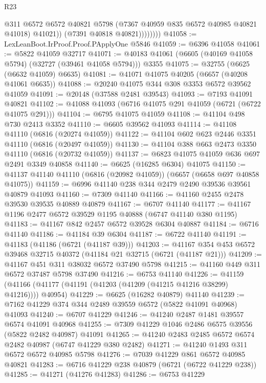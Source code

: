 \begin{lexlean}{R23}
\begin{coremodule}
                      @311
                      @6572
                      @6572
                      @40821
                      @5798
                      (@7367 @40959 @835 @6572 @40985 @40821 @41018)
                      @41021))
                  (@7391 @40818 @40821))))))))
@41058 := LexLeanBoot.IrProof.Proof.PApplyOne @5846
@41059 := @6396 @41058
@41061 := @5822 @41059 @32717
@41071 := @40183 @41061 (@6605 (@40169 @41058 @5794) (@32727 (@39461 @41058 @5794))) @3355
@41075 := @32755 (@6625 (@6632 @41059) @6635)
@41081 := @41071 @41075 @40205 (@6657 (@40208 @41061 @6635))
@41088 := @20240 @41075 @344 @308 @3353 @6572 @39562 @41059
@41091 := @20148 (@37588 @2481 @39543)
@41093 := @7193 @41091 @40821
@41102 := @41088 @41093 (@6716 @41075 @291 @41059 (@6721 (@6722 @41075 @291)))
@41104 := @6795 @41075 @41059
@41108 := @41104 @498 @730 @2413 @3352
@41110 := @6605 @39562 @41093
@41114 := @41108 @41110 (@6816 (@20274 @41059))
@41122 := @41104 @602 @623 @2446 @3351 @41110 (@6816 (@20497 @41059))
@41130 := @41104 @388 @663 @2473 @3350 @41110 (@6816 (@20732 @41059))
@41137 := @6823 @41075 @41059 @636 @697 @2491 @3349 @40858
@41140 := @6625 (@16285 @6304) @41075
@41150 := @41137 @41140 @41110 (@6816 (@20982 @41059)) (@6657 (@6658 @697 @40858 @41075))
@41159 := @6996 @41140 @238 @344 @2479 @2490 @39536 @39561 @40879 @41093
@41160 := @7309 @41140
@41166 := @41160 @2455 @2478 @39530 @39535 @40889 @40879
@41167 := @6707 @41140
@41177 := @41167 @1196 @2477 @6572 @39529 @1195 @40888 (@6747 @41140 @380 @1195)
@41183 := @41167 @842 @2457 @6572 @39528 @6304 @40887
@41184 := @6716 @41140
@41186 := @41184 @39 @6304
@41187 := @6722 @41140
@41191 := @41183 (@41186 (@6721 (@41187 @39)))
@41203 := @41167 @354 @453 @6572 @39468 @32715 @40372 (@41184 @21 @32715 (@6721 (@41187 @21)))
@41209 := @41167 @451 @311 @38032 @6572 @37490 @5798
@41215 := @41160 @449 @311 @6572 @37487 @5798 @37490
@41216 := @6753 @41140
@41226 := @41159 (@41166 (@41177 (@41191 (@41203 (@41209 (@41215 @41216 @38299) @41216)))) @40954)
@41229 := @6625 (@16282 @40879) @41140
@41239 := @7162 @41229 @374 @344 @2489 @39559 @6572 (@5822 @41091 @40968) @41093
@41240 := @6707 @41229
@41246 := @41240 @2487 @1481 @39557 @6574 @41091 @40968
@41255 := @7309 @41229 @1046 @2486 @6575 @39556 (@5822 @2482 @40987) @41091
@41265 := @41240 @2483 @2485 @6572 @6574 @2482 @40987 (@6747 @41229 @380 @2482)
@41271 := @41240 @1493 @311 @6572 @6572 @40985 @5798
@41276 := @7039 @41229 @861 @6572 @40985 @40821
@41283 := @6716 @41229 @238 @40879 (@6721 (@6722 @41229 @238))
@41285 := @41271 (@41276 @41283)
@41286 := @6753 @41229

\end{coremodule}
\end{lexlean}
